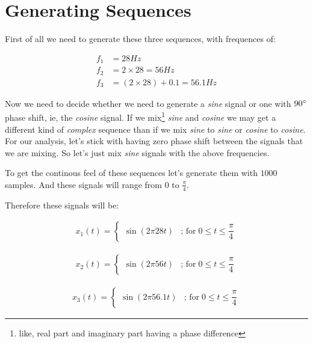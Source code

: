 \documentclass[../../course]{subfiles}
\begin{document}
\section{Generating Sequences} \label{sec:wrkGeneratingSeqcuences}

First of all we need to generate these three sequences, with frequences of:

\begin{align}
    f_{1} &= 28 \si{Hz}                         \label{eqn:freq1} \\
    f_{2} &= 2 \times 28         = 56   \si{Hz} \label{eqn:freq2} \\
    f_{3} &= (2 \times 28) + 0.1 = 56.1 \si{Hz} \label{eqn:freq3}
\end{align}

Now we need to decide whether we need to generate a \emph{sine} signal or one with
$90 \degree$ phase shift, ie, the \emph{cosine} signal. If we mix\footnote{like, real
part and imaginary part having a phase difference} \emph{sine} and \emph{cosine} we may
get a different kind of \emph{complex} sequence than if we mix \emph{sine} to \emph{sine}
or \emph{cosine} to \emph{cosine}. For our analysis, let's stick with having zero phase
shift between the signals that we are mixing. So let's just mix \emph{sine} signals with
the above frequencies.


To get the continous feel of these sequences let's generate them with $1000$ samples.
And these signals will range from $0$ to $\frac{\pi}{4}$.


Therefore these signals will be:

\begin{align}
    x_{1}(t) =
    \begin{cases}
        \sin(2 \pi 28 t) & \text{; for} \; 0 \le t \le \dfrac{\pi}{4}
    \end{cases}
    \label{eqn:seqx1}
\end{align}

\begin{align}
    x_{2}(t) =
    \begin{cases}
        \sin(2 \pi 56 t) & \text{; for} \; 0 \le t \le \dfrac{\pi}{4}
    \end{cases}
    \label{eqn:seqx2}
\end{align}

\begin{align}
    x_{3}(t) =
    \begin{cases}
        \sin(2 \pi 56.1 t) & \text{; for} \; 0 \le t \le \dfrac{\pi}{4}
    \end{cases}
    \label{eqn:seqx3}
\end{align}
\end{document}
